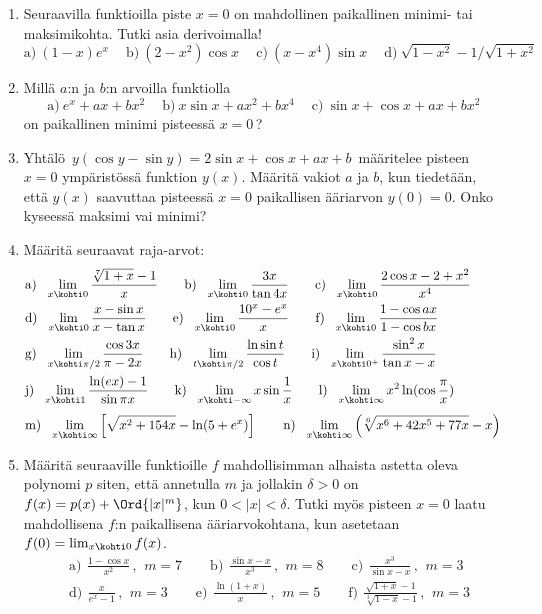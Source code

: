 \begin{enumerate}
\item 
Seuraavilla funktioilla piste $x=0$ on mahdollinen paikallinen minimi- tai maksimikohta.
Tutki asia derivoimalla!
\[
\text{a)}\ (1-x)e^x \quad\
\text{b)}\ (2-x^2)\cos x \quad\
\text{c)}\ (x-x^4)\sin x \quad\
\text{d)}\ \sqrt{1-x^2}-1/\sqrt{1+x^2}
\]

\item
Millä $a$:n ja $b$:n arvoilla funktiolla
\[
\text{a)}\ e^x+ax+bx^2 \quad\ 
\text{b)}\ x\sin x+ax^2+bx^4 \quad\ 
\text{c)}\ \sin x+\cos x+ax+bx^2
\]
on paikallinen minimi pisteessä $x=0$\,?

\item
Yhtälö $\,y(\cos y-\sin y)=2\sin x+\cos x+ax+b\,$ määritelee pisteen $x=0$ ympäristössä
funktion $y(x)$. Määritä vakiot $a$ ja $b$, kun tiedetään, että $y(x)$ saavuttaa pisteessä
$x=0$ paikallisen ääriarvon $y(0)=0$. Onko kyseessä maksimi vai minimi?

\item
Määritä seuraavat raja-arvot:
\begin{align*}
&\text{a)}\ \ \lim_{x \kohti 0}\frac{\sqrt[7]{1+x}-1}{x} \qquad
 \text{b)}\ \ \lim_{x \kohti 0}\frac{3x}{\tan 4x} \qquad
 \text{c)}\ \ \lim_{x \kohti 0}\frac{ 2\cos x-2+x^2 }{x^4 } \\
&\text{d)}\ \ \lim_{x \kohti 0}\frac{x-\sin x}{x-\tan x} \qquad
 \text{e)}\ \ \lim_{x \kohti 0}\frac{10^x-e^x}{x} \qquad
 \text{f)}\ \ \lim_{x \kohti 0}\frac{1-\cos ax}{1-\cos bx} \\
&\text{g)}\ \ \lim_{x\kohti\pi/2}\frac{\cos 3x}{\pi-2x} \qquad
 \text{h)}\ \ \lim_{t\kohti\pi/2}\frac{\ln\sin t}{\cos t} \qquad
 \text{i)}\ \ \lim_{x \kohti 0^+}\frac{\sin^2 x}{\tan x-x} \\
&\text{j)}\ \ \lim_{x \kohti 1}\frac{\ln(ex)-1}{\sin\pi x} \qquad
 \text{k)}\ \ \lim_{x \kohti -\infty} x\sin\frac{1}{x} \qquad
 \text{l)}\ \ \lim_{x\kohti\infty}x^2\ln(\cos\frac{\pi}{x}) \\[1mm]
&\text{m)}\ \ \lim_{x\kohti\infty} \left[\sqrt{x^2+154x}-\ln(5+e^x)\right] \qquad
 \text{n)}\ \ \lim_{x\kohti\infty}\left(\sqrt[6]{x^6+42x^5+77x}-x\right) \qquad
\end{align*}

\item
Määritä seuraaville funktioille $f$ mahdollisimman alhaista astetta oleva polynomi $p$
siten, että annetulla $m$ ja jollakin $\delta>0$ on $f(x)=p(x)+\Ord{|x|^m}$, kun
$0<|x|<\delta$. Tutki myös pisteen $x=0$ laatu mahdollisena $f$:n paikallisena
ääriarvokohtana, kun asetetaan $f(0)=\lim_{x \kohti 0} f(x)$.
\begin{align*}
&\text{a)}\,\ \frac{1-\cos x}{x^2}\,,\,\ m=7 \qquad
 \text{b)}\,\ \frac{\sin x-x}{x^3}\,,\,\ m=8 \qquad
 \text{c)}\,\ \frac{x^3}{\sin x-x}\,,\,\ m=3 \\
&\text{d)}\,\ \frac{x}{e^x-1}\,,\,\ m=3 \qquad
 \text{e)}\,\ \frac{\ln(1+x)}{x}\,,\,\ m=5 \qquad
 \text{f)}\,\ \frac{\sqrt{1+x}-1}{\sqrt[3]{1-x}-1}\,,\,\ m=3
\end{align*}


\end{enumerate}

